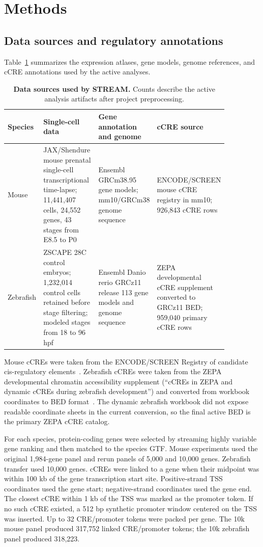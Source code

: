 \documentclass[11pt]{article}
\begin{document}
\section{Methods}

\subsection{Data sources and regulatory annotations}

Table~\ref{tab:data_sources} summarizes the expression atlases, gene models,
genome references, and cCRE annotations used by the active analyses.

\begin{table}[t]
\centering
\caption{\textbf{Data sources used by STREAM.} Counts describe the active
analysis artifacts after project preprocessing.}
\label{tab:data_sources}
\begin{tabular}{@{}p{0.15\linewidth}p{0.27\linewidth}p{0.24\linewidth}p{0.20\linewidth}@{}}
\toprule
Species & Single-cell data & Gene annotation and genome & cCRE source \\
\midrule
Mouse &
JAX/Shendure mouse prenatal single-cell transcriptional time-lapse;
11,441,407 cells, 24,552 genes, 43 stages from E8.5 to P0 &
Ensembl GRCm38.95 gene models; mm10/GRCm38 genome sequence &
ENCODE/\allowbreak SCREEN mouse cCRE registry in mm10; 926,843 cCRE rows \\
\addlinespace
Zebrafish &
ZSCAPE 28C control embryos; 1,232,014 control cells retained before
stage filtering; modeled stages from 18 to 96 hpf &
Ensembl Danio rerio GRCz11 release 113 gene models and genome sequence &
ZEPA developmental cCRE supplement converted to GRCz11 BED; 959,040
primary cCRE rows \\
\bottomrule
\end{tabular}
\end{table}

Mouse cCREs were taken from the ENCODE/SCREEN Registry of candidate
cis-regulatory elements~\cite{encode2025ccre,screen}. Zebrafish cCREs were
taken from the ZEPA developmental chromatin accessibility supplement
(``cCREs in ZEPA and dynamic cCREs during zebrafish development'') and
converted from workbook coordinates to BED format~\cite{zepa2024,figsharezepa}.
The dynamic zebrafish workbook did not expose readable coordinate sheets in the
current conversion, so the final active BED is the primary ZEPA cCRE catalog.

For each species, protein-coding genes were selected by streaming highly
variable gene ranking and then matched to the species GTF. Mouse experiments
used the original 1,984-gene panel and rerun panels of 5,000 and 10,000 genes.
Zebrafish transfer used 10,000 genes. cCREs were linked to a gene when their
midpoint was within 100 kb of the gene transcription start site. Positive-strand
TSS coordinates used the gene start; negative-strand coordinates used the gene
end. The closest cCRE within 1 kb of the TSS was marked as the promoter token.
If no such cCRE existed, a 512 bp synthetic promoter window centered on the TSS
was inserted. Up to 32 CRE/promoter tokens were packed per gene. The 10k mouse
panel produced 317,752 linked CRE/promoter tokens; the 10k zebrafish panel
produced 318,223.
\end{document}
